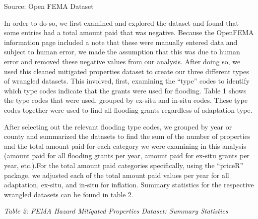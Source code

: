 \documentclass[
  12pt,
]{article}
\begin{document}
\begin{minipage}{\linewidth}
Source: Open FEMA Dataset\\
\end{minipage}

In order to do so, we first examined and explored the dataset and found
that some entries had a total amount paid that was negative. Because the
OpenFEMA information page included a note that these were manually
entered data and subject to human error, we made the assumption that
this was due to human error and removed these negative values from our
analysis. After doing so, we used this cleaned mitigated properties
dataset to create our three different types of wrangled datasets. This
involved, first, examining the ``type'' codes to identify which type
codes indicate that the grants were used for flooding. Table 1 shows the
type codes that were used, grouped by ex-situ and in-situ codes. These
type codes together were used to find all flooding grants regardless of
adaptation type.

After selecting out the relevant flooding type codes, we grouped by year
or county and summarized the datasets to find the sum of the number of
properties and the total amount paid for each category we were examining
in this analysis (amount paid for all flooding grants per year, amount
paid for ex-situ grants per year, etc.).For the total amount paid
categories specifically, using the ``priceR'' package, we adjusted each
of the total amount paid values per year for all adaptation, ex-situ,
and in-situ for inflation. Summary statistics for the respective
wrangled datasets can be found in table 2.

\newline

\emph{Table 2: FEMA Hazard Mitigated Properties Dataset: Summary
Statistics}\\
\captionsetup[table]{labelformat=empty,skip=1pt}
\setlength{\LTpost}{0mm}
\end{document}
